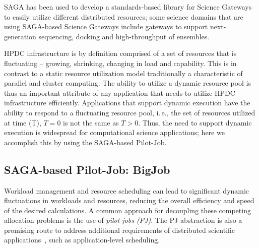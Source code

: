 \documentclass{sig-alternate}
\begin{document}
SAGA has been used to develop a standards-based library for Science
Gateways to easily utilize different distributed resources; some
science domains that are using SAGA-based Science Gateways include
gateways to support next-generation sequencing, docking and
high-throughput of ensembles.

HPDC infrastructure is by definition comprised of a set of resources
that is fluctuating -- growing, shrinking, changing in load and
capability. This is in contrast to a static resource utilization model
traditionally a characteristic of parallel and cluster computing. The
ability to utilize a dynamic resource pool is thus an important
attribute of any application that needs to utilize HPDC infrastructure
efficiently. Applications that support dynamic execution have the
ability to respond to a fluctuating resource pool, i.\,e., the set of
resources utilized at time (T), $T=0$ is not the same as $T>0$.  Thus,
the need to support dynamic execution is widespread for computational
science applications; here we accomplish this by using the SAGA-based
Pilot-Job.

\subsection{SAGA-based Pilot-Job: BigJob}

Workload management and resource scheduling can lead to significant dynamic 
fluctuations in workloads and resources, reducing the overall efficiency
and speed of the desired calculations. A common approach for decoupling 
these competing allocation problems is the use of \emph{pilot-jobs (PJ)}. The PJ
abstraction is also a promising route to address additional
requirements of distributed scientific
applications~\cite{ko-efficient,bigjob_cloudcom10}, such as
application-level scheduling.

 
\end{document}

